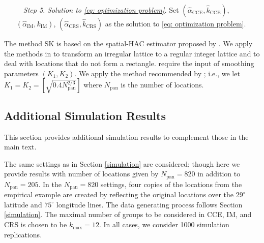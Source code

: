 \documentclass[preprint]{imsart}
\numberwithin{equation}{section}
\theoremstyle{plain}
\theoremstyle{definition}
\renewcommand{\(}{\left(}
\renewcommand{\)}{\right)}
\renewcommand{\[}{\left[}
\renewcommand{\]}{\right]}
\renewcommand{\hat}{\widehat}
\newcommand{\G}{k}
\renewcommand{\hat}{\widehat}
\begin{document}
{\begin{enumerate}
	For each partition size $\G=2,\dots, \G_{\max}$, compute simulated average Type II error rate  $ \widehat {\mathrm{Err}}_{\mathrm{Type-II}}(\mathrm{IM}(\hat a_{\text{IM}, \G}), \G)$, $ \widehat {\mathrm{Err}}_{\mathrm{Type-II}}(\mathrm{CRS}(\hat a_{\text{CRS}, \G}), \G)$, $ \widehat {\mathrm{Err}}_{\mathrm{Type-II}}(\mathrm{CCE}(\hat a_{\text{CCE}, \G}), \G)$ by testing $H_0:\theta_0=0$ for 
	$\theta \in \{-10/\sqrt{n},-9/\sqrt{n},\dots$ $\dots,-1/\sqrt{n},1/\sqrt{n},2/\sqrt{n},\dots,10/\sqrt{n} \}$ on each simulated dataset from \textit{Step 3} and averaging the Type 2 error obtained at each $\theta$ value. 
	
	
	\item[ \ \ \textit{Step 5.}] \textit{Solution to \eqref{eq: optimization problem}.} Set $(\widehat\alpha_{\mathrm{CCE}} , \hat \G_{\mathrm{CCE}})$, $(\widehat\alpha_{\mathrm{IM}} ,  \G_{\mathrm{IM}})$, $(\widehat\alpha_{\mathrm{CRS}} , \hat \G_{\mathrm{CRS}})$ as the solution to \eqref{eq: optimization problem}.
\end{enumerate}


The method SK is based on the spatial-HAC estimator proposed by \cite{Sun2015}. 
We apply the methods in \cite{Sun2015} to transform an irregular lattice to a regular integer lattice  and to deal with locations that do not form a rectangle. 
\cite{Sun2015} require the input of smoothing parameters $(K_1,K_2)$. 
We apply the method recommended by \cite{Lazarus2018}; i.e., we let $K_1=K_2=\left[\sqrt{0.4N_{\mathrm{pan}}^{2/3}} \right]$ where $N_{\mathrm{pan}}$ is the number of locations. 

\linespread{1.35}



	

\subsection{Additional Simulation Results}

This section provides additional simulation results to complement those in the main text. 



The same settings as in Section \ref{simulation} are considered; though here we provide results with number of locations given by $N_{\mathrm{pan}}=820$ in addition to $N_{\mathrm{pan}}=205$. 
In the $N_{\mathrm{pan}}=820$ settings, four copies of the locations from the empirical example are created by reflecting the original locations over the $29^\circ$ latitude and $75^\circ$ longitude lines.
The data generating process follows Section \ref{simulation}.
The maximal number of groups to be considered in CCE, IM, and CRS is chosen to be ${\G_{\mathrm{max}}} = 12.$
In all cases, we consider 1000 simulation replications.

}
\end{document}
